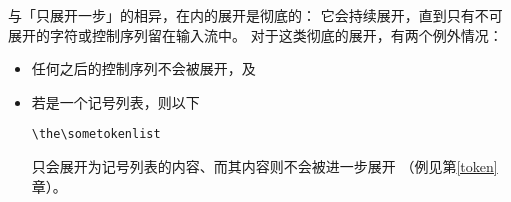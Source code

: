 \documentclass{book}
\begin{document}
与「只展开一步」的相异，在内的展开是彻底的：
它会持续展开，直到只有不可展开的字符或控制序列留在输入流中。
对于这类彻底的展开，有两个例外情况：
\begin{itemize} \item 任何之后的控制序列不会被展开，及
    \item 若是一个记号列表，则以下
\begin{verbatim}
\the\sometokenlist 
\end{verbatim}
只会展开为记号列表的内容、而其内容则不会被进一步展开
（例见第\ref{token}章）。
\end{itemize}
\end{document}
